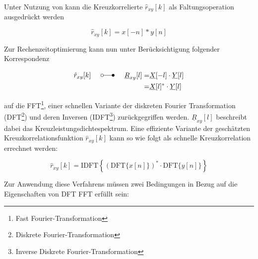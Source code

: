 Unter Nutzung von  kann die Kreuzkorrelierte $\hat r_{xy}[k]$ als Faltungsoperation ausgedrückt werden

\begin{equation}
    \hat r_{xy}[k] = x[-n] \ast y[n]
\end{equation}

Zur Rechenzeitoptimierung kann nun unter Berücksichtigung folgender Korrespondenz

\begin{align}
    \hat r_{xy}[k] \eqspace \laplace \eqspace \underline{R}_{xy}[l] = & \underline{X}[-l] \cdot \underline{Y}[l] \\
    = & \underline{X}[l]^{*} \cdot \underline{Y}[l]
\end{align}

auf die FFT\footnote{Fast Fourier-Transformation}, einer schnellen Variante der diskreten Fourier Transformation (DFT\footnote{Diskrete Fourier-Transformation}) und deren Inversen (IDFT\footnote{Inverse Diskrete Fourier-Transformation}) zurückgegriffen werden. $\underline{R}_{xy}[l]$ beschreibt dabei das Kreuzleistungsdichtespektrum. Eine effiziente Variante der geschätzten Kreuzkorrelationsfunktion $\hat r_{xy}[k]$ kann so wie folgt als schnelle Kreuzkorrelation errechnet werden:

\begin{equation}
    \hat r_{xy}[k] = \mathrm{IDFT} \left \{ \left ( \mathrm{DFT}\{ x[n] \}\right )^* \cdot  \mathrm{DFT}\{ y[n] \} \right \}
\end{equation}


Zur Anwendung diese Verfahrens müssen zwei Bedingungen in Bezug auf die Eigenschaften von DFT \bzw FFT erfüllt sein:

